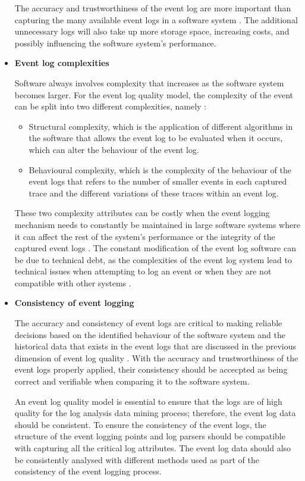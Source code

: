 \begin{itemize}
	The accuracy and trustworthiness of the event log are more important than capturing the many available event logs in a software system \cite{Zhu2015, Jans2012}. The additional unnecessary logs will also take up more storage space, increasing costs, and possibly influencing the software system's performance.
	
	\clearpage

	\item \textbf{Event log complexities}\par Software always involves complexity that increases as the software system becomes larger. For the event log quality model, the complexity of the event can be split into two different complexities, namely \cite{Kherbouche2017}:

	\begin{itemize}
		\item Structural complexity, which is the application of different algorithms in the software that allows the event log to be evaluated when it occurs, which can alter the behaviour of the event log.
		\item Behavioural complexity, which is the complexity of the behaviour of the event logs that refers to the number of smaller events in each captured trace and the different variations of these traces within an event log.
	\end{itemize}

	These two complexity attributes can be costly when the event logging mechanism needs to constantly be maintained in large software systems where it can affect the rest of the system's performance or the integrity of the captured event logs \cite{Ogheneovo2014}. The constant modification of the event log software can be due to technical debt, as the complexities of the event log system lead to technical issues when attempting to log an event or when they are not compatible with other systems \cite{DeLeon-Sigg2020}.  

 	\item \textbf{Consistency of event logging}\par The accuracy and consistency of event logs are critical to making reliable decisions based on the identified behaviour of the software system and the historical data that exists in the event logs that are discussed in the previous dimension of event log quality \cite{Stojanov2017, Kherbouche2017}. With the accuracy and trustworthiness of the event logs properly applied, their consistency should be accecpted as being correct and verifiable when comparing it to the software system. \par An event log quality model is essential to ensure that the logs are of high quality for the log analysis data mining process; therefore, the event log data should be consistent. To ensure the consistency of the event logs, the structure of the event logging points and log parsers should be compatible with capturing all the critical log attributes. The event log data should also be consistently analysed with different methods used as part of the consistency of the event logging process.


\end{itemize}
